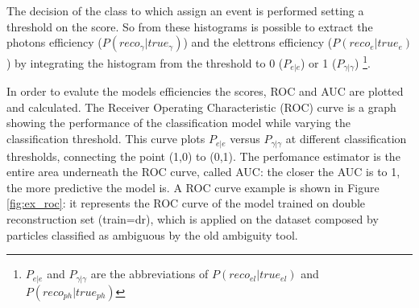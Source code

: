 \documentclass[a4paper, oneside, 11pt, openright]{book}
\begin{document}
		    The decision of the class to which assign an event is performed setting a threshold on the score. So from these histograms is possible to extract the photons efficiency ($P(reco_{\gamma}|true_{\gamma})$)
			and the elettrons efficiency ($P(reco_{e}|true_{e})$)
			by integrating the histogram from the threshold to 0 ($P_{e|e}$) or 1 ($P_{\gamma|\gamma}$) \footnote{$P_{e|e}$ and $P_{\gamma|\gamma}$ are the abbreviations of $P(reco_{el}|true_{el})$ and $P(reco_{ph}|true_{ph})$}.
			
			In order to evalute the models efficiencies the scores, ROC and AUC are plotted and calculated.
			The Receiver Operating Characteristic (ROC) curve is a graph showing the performance of the classification model while varying the classification threshold. This curve plots  $P_{e|e}$ versus $P_{\gamma|\gamma}$ at different classification thresholds, connecting the point (1,0) to (0,1). The perfomance estimator is the entire area underneath the ROC curve, called AUC: the closer the AUC is to 1, the more predictive the model is. A ROC curve example is shown in Figure \ref{fig:ex_roc}: it represents the ROC curve of the model trained on double reconstruction set (train=dr), which is applied on the dataset composed by particles classified as ambiguous by the old ambiguity tool.
			
			
			
			
\end{document}
